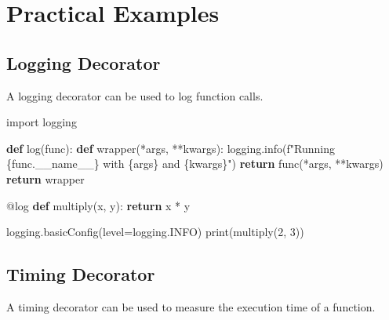 \documentclass[
  letterpaper,
  DIV=11,
  numbers=noendperiod]{scrreprt}
\newenvironment{Shaded}{\begin{snugshade}}{\end{snugshade}}
\newcommand{\AttributeTok}[1]{\textcolor[rgb]{0.40,0.45,0.13}{#1}}
\newcommand{\BuiltInTok}[1]{\textcolor[rgb]{0.00,0.23,0.31}{#1}}
\newcommand{\ControlFlowTok}[1]{\textcolor[rgb]{0.00,0.23,0.31}{\textbf{#1}}}
\newcommand{\DecValTok}[1]{\textcolor[rgb]{0.68,0.00,0.00}{#1}}
\newcommand{\ImportTok}[1]{\textcolor[rgb]{0.00,0.46,0.62}{#1}}
\newcommand{\KeywordTok}[1]{\textcolor[rgb]{0.00,0.23,0.31}{\textbf{#1}}}
\newcommand{\NormalTok}[1]{\textcolor[rgb]{0.00,0.23,0.31}{#1}}
\newcommand{\OperatorTok}[1]{\textcolor[rgb]{0.37,0.37,0.37}{#1}}
\newcommand{\SpecialCharTok}[1]{\textcolor[rgb]{0.37,0.37,0.37}{#1}}
\newcommand{\SpecialStringTok}[1]{\textcolor[rgb]{0.13,0.47,0.30}{#1}}
\newcommand{\VariableTok}[1]{\textcolor[rgb]{0.07,0.07,0.07}{#1}}
\begin{document}
\section{Practical Examples}\label{practical-examples-4}

\subsection{Logging Decorator}\label{logging-decorator}

A logging decorator can be used to log function calls.

\begin{Shaded}
\begin{Highlighting}[]
\ImportTok{import}\NormalTok{ logging}

\KeywordTok{def}\NormalTok{ log(func):}
    \KeywordTok{def}\NormalTok{ wrapper(}\OperatorTok{*}\NormalTok{args, }\OperatorTok{**}\NormalTok{kwargs):}
\NormalTok{        logging.info(}\SpecialStringTok{f"Running }\SpecialCharTok{\{}\NormalTok{func}\SpecialCharTok{.}\VariableTok{\_\_name\_\_}\SpecialCharTok{\}}\SpecialStringTok{ with }\SpecialCharTok{\{}\NormalTok{args}\SpecialCharTok{\}}\SpecialStringTok{ and }\SpecialCharTok{\{}\NormalTok{kwargs}\SpecialCharTok{\}}\SpecialStringTok{"}\NormalTok{)}
        \ControlFlowTok{return}\NormalTok{ func(}\OperatorTok{*}\NormalTok{args, }\OperatorTok{**}\NormalTok{kwargs)}
    \ControlFlowTok{return}\NormalTok{ wrapper}

\AttributeTok{@log}
\KeywordTok{def}\NormalTok{ multiply(x, y):}
    \ControlFlowTok{return}\NormalTok{ x }\OperatorTok{*}\NormalTok{ y}

\NormalTok{logging.basicConfig(level}\OperatorTok{=}\NormalTok{logging.INFO)}
\BuiltInTok{print}\NormalTok{(multiply(}\DecValTok{2}\NormalTok{, }\DecValTok{3}\NormalTok{))}
\end{Highlighting}
\end{Shaded}

\subsection{Timing Decorator}\label{timing-decorator}

A timing decorator can be used to measure the execution time of a
function.
\end{document}
